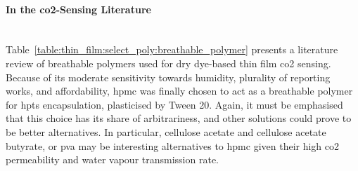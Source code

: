 \paragraph{In the \texorpdfstring{\gls{co2}}{CO2}-Sensing Literature}\label{subsect:thin_film:breath_lite}\mbox{}\\

Table~\ref{table:thin_film:select_poly:breathable_polymer} presents a literature review of breathable polymers used for dry dye-based thin film \gls{co2} sensing. Because of its moderate sensitivity towards humidity, plurality of reporting works, and affordability, \gls{hpmc} was finally chosen to act as a breathable polymer for \gls{hpts} encapsulation, plasticised by Tween 20. Again, it must be emphasised that this choice has its share of arbitrariness, and other solutions could prove to be better alternatives. In particular, cellulose acetate and cellulose acetate butyrate, or \gls{pva} may be interesting alternatives to \gls{hpmc} given their high \gls{co2} permeability and water vapour transmission rate\cite{tock1983}.

